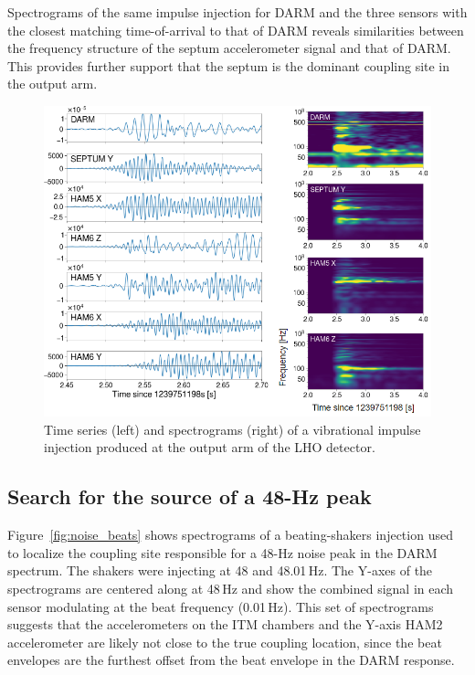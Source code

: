 Spectrograms of the same impulse injection for \ac{DARM} and the three sensors with the closest matching time-of-arrival to that of \ac{DARM} reveals similarities between the frequency structure of the septum accelerometer signal and that of \ac{DARM}.
This provides further support that the septum is the dominant coupling site in the output arm.

\begin{figure}[h!]
	\centering
	\includegraphics[width=\textwidth]{figures/noise-impulse.png}
	\caption{
		Time series (left) and spectrograms (right) of a vibrational impulse injection produced at the output arm of the LHO detector.}
	\label{fig:noise_impulse}
\end{figure}



\subsection{Search for the source of a 48-Hz peak}\label{sec:noise-vib-48hz}

Figure~\ref{fig:noise_beats} shows spectrograms of a beating-shakers injection used to localize the coupling site responsible for a 48\hyp Hz noise peak in the \ac{DARM} spectrum.
The shakers were injecting at 48 and 48.01\,Hz. The Y-axes of the spectrograms are centered along at 48\,Hz and show the combined signal in each sensor modulating at the beat frequency (0.01\,Hz).
This set of spectrograms suggests that the accelerometers on the \ac{ITM} chambers and the Y-axis HAM2 accelerometer are likely not close to the true coupling location, since the beat envelopes are the furthest offset from the beat envelope in the \ac{DARM} response.

